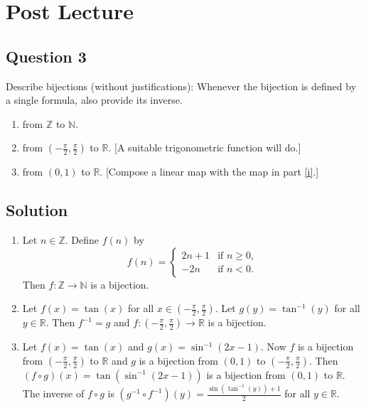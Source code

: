 \documentclass{article}
\begin{document}
\vspace{3mm}
\section*{Post Lecture}
 
\subsection*{Question 3}
    Describe bijections (without justifications): Whenever the bijection is defined by a single formula, also provide its inverse.
    \begin{enumerate}
        \item from $\mathbb{Z}$ to $\mathbb{N}$.
        \item \label{i} from $(-\frac{\pi}{2}, \frac{\pi}{2})$ to $\mathbb{R}$. [A suitable trigonometric function will do.]
        \item from $(0, 1)$ to $\mathbb{R}$. [Compose a linear map with the map in part \ref{i}.]
    \end{enumerate}

\vspace{1.5mm}
\subsection*{Solution}
    \begin{enumerate}
        \item Let $n \in \mathbb{Z}$. Define $f(n)$ by
        $$f(n) = 
        \begin{cases}
            2n + 1 & \text{if } n \ge 0, \\
            -2n & \text{if } n < 0.
        \end{cases}$$
        Then $f: \mathbb{Z} \rightarrow \mathbb{N}$ is a bijection.
        \item Let $f(x) = \tan(x)$ for all $x \in (-\frac{\pi}{2}, \frac{\pi}{2})$. Let $g(y) = \tan^{-1}(y)$ for all $y \in \mathbb{R}$. Then $f^{-1} = g$ and $f: (-\frac{\pi}{2}, \frac{\pi}{2}) \rightarrow \mathbb{R}$ is a bijection.
        \item Let $f(x) = \tan(x)$ and $g(x) = \sin^{-1}(2x - 1)$. Now $f$ is a bijection from $(-\frac{\pi}{2}, \frac{\pi}{2})$ to $\mathbb{R}$ and $g$ is a bijection from $(0, 1)$ to $(-\frac{\pi}{2}, \frac{\pi}{2})$. Then $(f \circ g)(x) = \tan(\sin^{-1}(2x - 1))$ is a bijection from $(0, 1)$ to $\mathbb{R}$. The inverse of $f \circ g$ is $(g^{-1} \circ f^{-1})(y) = \frac{\sin(\tan^{-1}(y)) + 1}{2}$ for all $y \in \mathbb{R}$.
    \end{enumerate}
\end{document}
